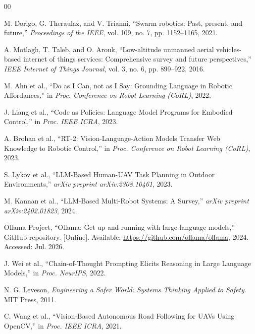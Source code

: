 \documentclass[conference]{IEEEtran}
\begin{document}
\begin{thebibliography}{00}

M. Dorigo, G. Theraulaz, and V. Trianni, ``Swarm robotics: Past, present, and future,'' \textit{Proceedings of the IEEE}, vol. 109, no. 7, pp. 1152–1165, 2021.

A. Motlagh, T. Taleb, and O. Arouk, ``Low-altitude unmanned aerial vehicles-based internet of things services: Comprehensive survey and future perspectives,'' \textit{IEEE Internet of Things Journal}, vol. 3, no. 6, pp. 899–922, 2016.

M. Ahn et al., ``Do as I Can, not as I Say: Grounding Language in Robotic Affordances,'' in \textit{Proc. Conference on Robot Learning (CoRL)}, 2022.

J. Liang et al., ``Code as Policies: Language Model Programs for Embodied Control,'' in \textit{Proc. IEEE ICRA}, 2023.

A. Brohan et al., ``RT-2: Vision-Language-Action Models Transfer Web Knowledge to Robotic Control,'' in \textit{Proc. Conference on Robot Learning (CoRL)}, 2023.

S. Lykov et al., ``LLM-Based Human-UAV Task Planning in Outdoor Environments,'' \textit{arXiv preprint arXiv:2308.10461}, 2023.

M. Kannan et al., ``LLM-Based Multi-Robot Systems: A Survey,'' \textit{arXiv preprint arXiv:2402.01823}, 2024.

Ollama Project, ``Ollama: Get up and running with large language models,'' GitHub repository. [Online]. Available: \url{https://github.com/ollama/ollama}, 2024. Accessed: Jul. 2026.

J. Wei et al., ``Chain-of-Thought Prompting Elicits Reasoning in Large Language Models,'' in \textit{Proc. NeurIPS}, 2022.

N. G. Leveson, \textit{Engineering a Safer World: Systems Thinking Applied to Safety}. MIT Press, 2011.

C. Wang et al., ``Vision-Based Autonomous Road Following for UAVs Using OpenCV,'' in \textit{Proc. IEEE ICRA}, 2021.

\end{thebibliography}
\end{document}
